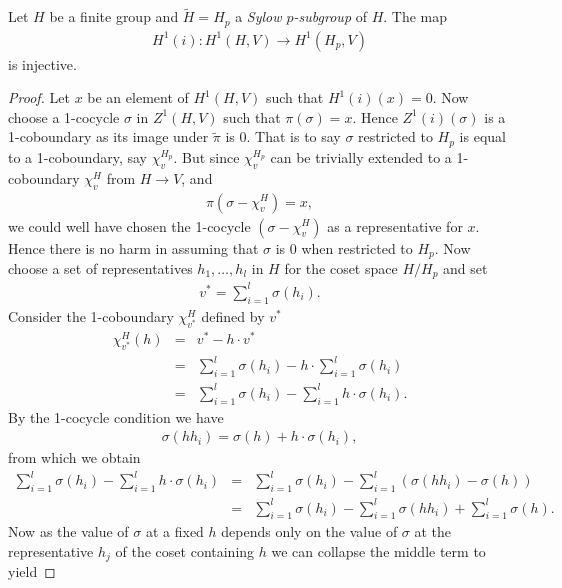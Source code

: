 \begin{lemma}\label{ch4::mapFromSylow}
Let $H$ be a finite group and $\tilde{H} = H_p$ a \emph{Sylow $p$-subgroup} of $H$. The map 
\begin{eqnarray*}
H^1(i):H^1(H, V)\rightarrow H^1(H_p, V)
\end{eqnarray*}
is injective.
\end{lemma}
\begin{proof}
Let $x$ be an element of $H^1(H, V)$ such that $H^1(i)(x) = 0$. Now choose a 1-cocycle $\sigma$ in $Z^1(H, V)$ such that $\pi(\sigma) = x$. Hence $Z^1(i)(\sigma)$ is a 1-coboundary as its image under $\tilde\pi$ is 0. That is to say $\sigma$ restricted to $H_p$ is equal to a 1-coboundary, say $\chi_v^{H_p}$. But since $\chi_v^{H_p}$ can be trivially extended to a 1-coboundary $\chi_v^H$ from $H\rightarrow V$, and
\begin{eqnarray*}
	\pi(\sigma - \chi_v^H) = x,
\end{eqnarray*}
we could well have chosen the 1-cocycle $(\sigma - \chi_v^H)$ as a representative for $x$. Hence there is no harm in assuming that $\sigma$ is 0 when restricted to $H_p$.
Now choose a set of representatives $h_1, \ldots, h_l$ in $H$ for the coset space $H/H_p$ and set
\begin{eqnarray*}
	v^* = \sum_{i =1}^l \sigma(h_i).
\end{eqnarray*}
Consider the 1-coboundary $\chi_{v^*}^H$ defined by $v^*$
\begin{eqnarray*}
	\chi_{v^*}^H(h) &=& v^* - h\cdot v^* \\
	&=& \sum_{i = 1}^l\sigma(h_i) - h\cdot \sum_{i = 1}^l\sigma(h_i) \\
	&=& \sum_{i = 1}^l\sigma(h_i) - \sum_{i = 1}^l h\cdot \sigma(h_i).
\end{eqnarray*}
By the 1-cocycle condition we have
\begin{eqnarray*}
	\sigma(h h_i) = \sigma(h) + h\cdot\sigma(h_i),
\end{eqnarray*}
from which we obtain
\begin{eqnarray*}
	 \sum_{i = 1}^l\sigma(h_i) - \sum_{i = 1}^l h\cdot \sigma(h_i) &=& \sum_{i = 1}^l\sigma(h_i) - \sum_{i = 1}^l \left(\sigma(hh_i) - \sigma(h) \right)\\
	 &=& \sum_{i = 1}^l\sigma(h_i) - \sum_{i = 1}^l \sigma(hh_i) +\sum_{i = 1}^l \sigma(h).
\end{eqnarray*}
Now as the value of $\sigma$ at a fixed $h$ depends only on the value of $\sigma$ at the representative $h_j$ of the coset containing $h$ we can collapse the middle term to yield

\end{proof}
